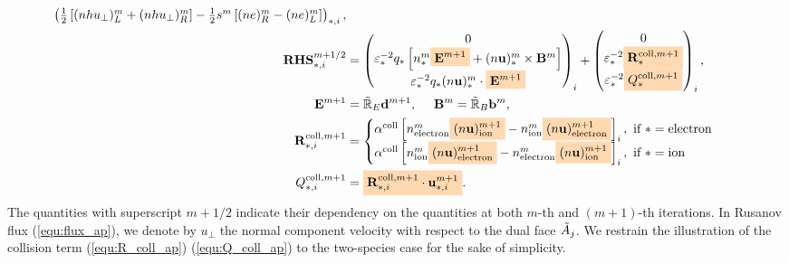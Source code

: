 \documentclass{article}
\newcommand{\mycolorbox}[2]{\colorbox{#1}{$\displaystyle#2$}}
\begin{document}
\begin{subequations}
\begin{align}
\begin{pmatrix}
    \frac{1}{2}\left[(nhu_\bot)^m_{L} + (nhu_\bot)^m_{R}\right] - \frac{1}{2}s^m\left[(ne)^m_{R} - (ne)^m_{L}\right]
    \end{pmatrix}_{\ast,i}, \label{equ:flux_ap}\\
    \mathbf{RHS}_{*,i}^{m+1/2} &=
    \begin{pmatrix}
    0 \\
    \varepsilon_*^{-2}q_*\left[n_*^m\mycolorbox{orange!30}{\mathbf{E}^{m+1}} + (n\mathbf{u})^m_*\times\mathbf{B}^m\right] \\
    \varepsilon_*^{-2}q_*(n\mathbf{u})^m_* \cdot \mycolorbox{orange!30}{\mathbf{E}^{m+1}}
    \end{pmatrix}_i +
    \begin{pmatrix}
    0 \\
    \varepsilon_*^{-2}\mycolorbox{orange!30}{\mathbf{R}_{*}^{\text{coll},m+1}} \\
    \varepsilon_*^{-2}\mycolorbox{orange!30}{Q_*^{\text{coll}, m+1}} 
    \end{pmatrix}_i, \label{equ:rhs_ap}\\
    \mathbf{E}^{m+1} &= \Tilde{\mathbb{R}}_E\mathbf{d}^{m+1},
    \ \ \ \ 
    \mathbf{B}^{m} = \Tilde{\mathbb{R}}_B\mathbf{b}^{m}, \\
    \mathbf{R}_{*,i}^{\text{coll},m+1} &= 
    \begin{cases}
    \alpha^\text{coll}\left[n_{\text{electron}}^m\mycolorbox{orange!30}{(n\mathbf{u})^{m+1}_{\text{ion}}} - n_{\text{ion}}^m\mycolorbox{orange!30}{(n\mathbf{u})^{m+1}_{\text{electron}}}\right]_i, \text{   if   } * = \text{electron} \\
    \alpha^\text{coll}\left[n_{\text{ion}}^m\mycolorbox{orange!30}{(n\mathbf{u})^{m+1}_{\text{electron}}} - n_{\text{electron}}^m\mycolorbox{orange!30}{(n\mathbf{u})^{m+1}_{\text{ion}}}\right]_i, \text{   if   } * = \text{ion}
    \end{cases}  \label{equ:R_coll_ap}\\
    Q_{*,i}^{\text{coll},m+1} &= \mycolorbox{orange!30}{\mathbf{R}_{*,i}^{\text{coll},m+1} \cdot \mathbf{u}_{\ast,i}^{m+1}} \label{equ:Q_coll_ap}
.\end{align}
\end{subequations}
The quantities with superscript $m+1/2$ indicate their dependency on the quantities at both $m$-th and $(m+1)$-th iterations. In Rusanov flux (\ref{equ:flux_ap}), we denote by $u_\perp$ the normal component velocity with respect to the dual face $\Tilde{A}_j$. We restrain the illustration of the collision term (\ref{equ:R_coll_ap}) (\ref{equ:Q_coll_ap}) to the two-species case for the sake of simplicity. 
\end{document}
